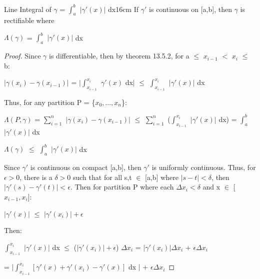     \vspace{0.5cm}



    \begin{wtheorem}{Line Integral of $\gamma$ = $\int_a^b$ $|\gamma'(x)|$ dx}{16cm}
        If $\gamma'$ is continuous on [a,b], then $\gamma$ is rectifiable where

        \hspace{0.5cm}
        $\Lambda(\gamma)$ = $\int_a^b$ $|\gamma'(x)|$ dx        
    \end{wtheorem}
    
    \begin{proof}
        Since $\gamma$ is differentiable, then by {\color{red} theorem 13.5.2},
        for a $\leq$ $x_{i-1}$ $<$ $x_i$ $\leq$ b:

        \hspace{0.5cm}
        $|\gamma(x_i) - \gamma(x_{i-1})|$
        = $|\int_{x_{i-1}}^{x_i}$ $\gamma'(x)$ dx$|$
        $\leq$ $\int_{x_{i-1}}^{x_i}$ $|\gamma'(x)|$ dx

        Thus, for any partition P = \{$x_0,...,x_n$\}:

        \hspace{0.5cm}
        $\Lambda(P,\gamma)$
        = $\sum_{i=1}^n$ $|\gamma(x_i) - \gamma(x_{i-1})|$
        $\leq$ $\sum_{i=1}^n$ ($\int_{x_{i-1}}^{x_i}$ $|\gamma'(x)|$ dx)
        = $\int_a^b$ $|\gamma'(x)|$ dx

        \hspace{0.5cm}
        $\Lambda(\gamma)$ $\leq$ $\int_a^b$ $|\gamma'(x)|$ dx

        Since $\gamma'$ is continuous on compact [a,b], then $\gamma'$ is uniformly
        continuous.
        Thus, for $\epsilon > 0$, there is a $\delta > 0$ such that for all
        s,t $\in$ [a,b] where $|s-t| < \delta$, then
        $|\gamma'(s) - \gamma'(t)| < \epsilon$.
        Then for partition P where each $\Delta x_i < \delta$ and
        x $\in$ [$x_{i-1},x_i$]:

        \hspace{0.5cm}
        $|\gamma'(x)|$ $\leq$ $|\gamma'(x_i)| + \epsilon$

        Then:

        \hspace{0.5cm}
        $\int_{x_{i-1}}^{x_i}$ $|\gamma'(x)|$ dx
        $\leq$ ($|\gamma'(x_i)| + \epsilon$) $\Delta x_i$
        = $|\gamma'(x_i)|\Delta x_i$ + $\epsilon \Delta x_i$
        
        \hspace{3.3cm}
        = $|\int_{x_{i-1}}^{x_i} [\gamma'(x) + \gamma'(x_i) - \gamma'(x)]$ dx $|$
            + $\epsilon \Delta x_i$


\end{proof}
